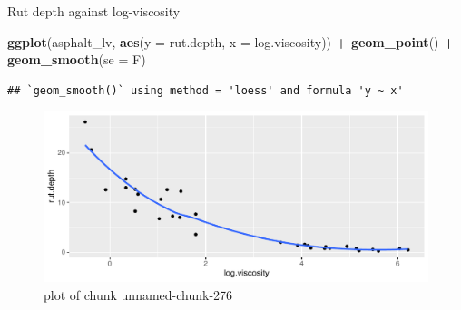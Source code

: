 \documentclass[
  ignorenonframetext,
]{beamer}
\newenvironment{Shaded}{\begin{snugshade}}{\end{snugshade}}
\newcommand{\DataTypeTok}[1]{\textcolor[rgb]{0.13,0.29,0.53}{#1}}
\newcommand{\KeywordTok}[1]{\textcolor[rgb]{0.13,0.29,0.53}{\textbf{#1}}}
\newcommand{\NormalTok}[1]{#1}
\newcommand{\OperatorTok}[1]{\textcolor[rgb]{0.81,0.36,0.00}{\textbf{#1}}}
\newcommand{\StringTok}[1]{\textcolor[rgb]{0.31,0.60,0.02}{#1}}
\begin{document}
\begin{frame}[fragile]{Rut depth against log-viscosity}
\protect\hypertarget{rut-depth-against-log-viscosity}{}

\begin{Shaded}
\begin{Highlighting}[]
\KeywordTok{ggplot}\NormalTok{(asphalt_lv, }\KeywordTok{aes}\NormalTok{(}\DataTypeTok{y =}\NormalTok{ rut.depth, }\DataTypeTok{x =}\NormalTok{ log.viscosity)) }\OperatorTok{+}
\StringTok{  }\KeywordTok{geom_point}\NormalTok{() }\OperatorTok{+}\StringTok{ }\KeywordTok{geom_smooth}\NormalTok{(}\DataTypeTok{se =}\NormalTok{ F)}
\end{Highlighting}
\end{Shaded}

\begin{verbatim}
## `geom_smooth()` using method = 'loess' and formula 'y ~ x'
\end{verbatim}

\begin{figure}
\centering
\includegraphics{figure/unnamed-chunk-276-1.pdf}
\caption{plot of chunk unnamed-chunk-276}
\end{figure}

\end{frame}
\end{document}
